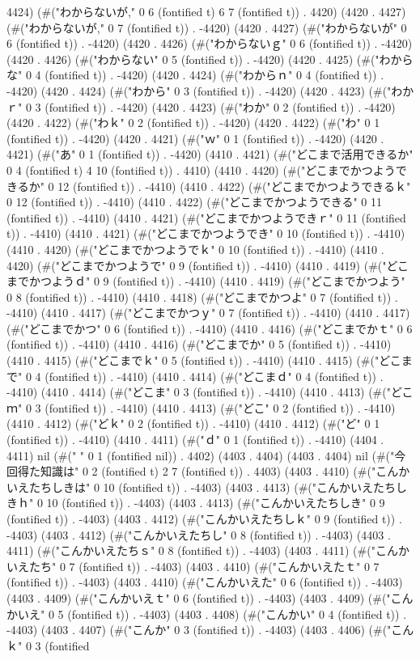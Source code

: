 4424) (#("わからないが," 0 6 (fontified t) 6 7 (fontified t)) . 4420) (4420 . 4427) (#("わからないが," 0 7 (fontified t)) . -4420) (4420 . 4427) (#("わからないが" 0 6 (fontified t)) . -4420) (4420 . 4426) (#("わからないｇ" 0 6 (fontified t)) . -4420) (4420 . 4426) (#("わからない" 0 5 (fontified t)) . -4420) (4420 . 4425) (#("わからな" 0 4 (fontified t)) . -4420) (4420 . 4424) (#("わからｎ" 0 4 (fontified t)) . -4420) (4420 . 4424) (#("わから" 0 3 (fontified t)) . -4420) (4420 . 4423) (#("わかｒ" 0 3 (fontified t)) . -4420) (4420 . 4423) (#("わか" 0 2 (fontified t)) . -4420) (4420 . 4422) (#("わｋ" 0 2 (fontified t)) . -4420) (4420 . 4422) (#("わ" 0 1 (fontified t)) . -4420) (4420 . 4421) (#("ｗ" 0 1 (fontified t)) . -4420) (4420 . 4421) (#("あ" 0 1 (fontified t)) . -4420) (4410 . 4421) (#("どこまで活用できるか" 0 4 (fontified t) 4 10 (fontified t)) . 4410) (4410 . 4420) (#("どこまでかつようできるか" 0 12 (fontified t)) . -4410) (4410 . 4422) (#("どこまでかつようできるｋ" 0 12 (fontified t)) . -4410) (4410 . 4422) (#("どこまでかつようできる" 0 11 (fontified t)) . -4410) (4410 . 4421) (#("どこまでかつようできｒ" 0 11 (fontified t)) . -4410) (4410 . 4421) (#("どこまでかつようでき" 0 10 (fontified t)) . -4410) (4410 . 4420) (#("どこまでかつようでｋ" 0 10 (fontified t)) . -4410) (4410 . 4420) (#("どこまでかつようで" 0 9 (fontified t)) . -4410) (4410 . 4419) (#("どこまでかつようｄ" 0 9 (fontified t)) . -4410) (4410 . 4419) (#("どこまでかつよう" 0 8 (fontified t)) . -4410) (4410 . 4418) (#("どこまでかつよ" 0 7 (fontified t)) . -4410) (4410 . 4417) (#("どこまでかつｙ" 0 7 (fontified t)) . -4410) (4410 . 4417) (#("どこまでかつ" 0 6 (fontified t)) . -4410) (4410 . 4416) (#("どこまでかｔ" 0 6 (fontified t)) . -4410) (4410 . 4416) (#("どこまでか" 0 5 (fontified t)) . -4410) (4410 . 4415) (#("どこまでｋ" 0 5 (fontified t)) . -4410) (4410 . 4415) (#("どこまで" 0 4 (fontified t)) . -4410) (4410 . 4414) (#("どこまｄ" 0 4 (fontified t)) . -4410) (4410 . 4414) (#("どこま" 0 3 (fontified t)) . -4410) (4410 . 4413) (#("どこｍ" 0 3 (fontified t)) . -4410) (4410 . 4413) (#("どこ" 0 2 (fontified t)) . -4410) (4410 . 4412) (#("どｋ" 0 2 (fontified t)) . -4410) (4410 . 4412) (#("ど" 0 1 (fontified t)) . -4410) (4410 . 4411) (#("ｄ" 0 1 (fontified t)) . -4410) (4404 . 4411) nil (#(" " 0 1 (fontified nil)) . 4402) (4403 . 4404) (4403 . 4404) nil (#("今回得た知識は" 0 2 (fontified t) 2 7 (fontified t)) . 4403) (4403 . 4410) (#("こんかいえたちしきは" 0 10 (fontified t)) . -4403) (4403 . 4413) (#("こんかいえたちしきｈ" 0 10 (fontified t)) . -4403) (4403 . 4413) (#("こんかいえたちしき" 0 9 (fontified t)) . -4403) (4403 . 4412) (#("こんかいえたちしｋ" 0 9 (fontified t)) . -4403) (4403 . 4412) (#("こんかいえたちし" 0 8 (fontified t)) . -4403) (4403 . 4411) (#("こんかいえたちｓ" 0 8 (fontified t)) . -4403) (4403 . 4411) (#("こんかいえたち" 0 7 (fontified t)) . -4403) (4403 . 4410) (#("こんかいえたｔ" 0 7 (fontified t)) . -4403) (4403 . 4410) (#("こんかいえた" 0 6 (fontified t)) . -4403) (4403 . 4409) (#("こんかいえｔ" 0 6 (fontified t)) . -4403) (4403 . 4409) (#("こんかいえ" 0 5 (fontified t)) . -4403) (4403 . 4408) (#("こんかい" 0 4 (fontified t)) . -4403) (4403 . 4407) (#("こんか" 0 3 (fontified t)) . -4403) (4403 . 4406) (#("こんｋ" 0 3 (fontified 